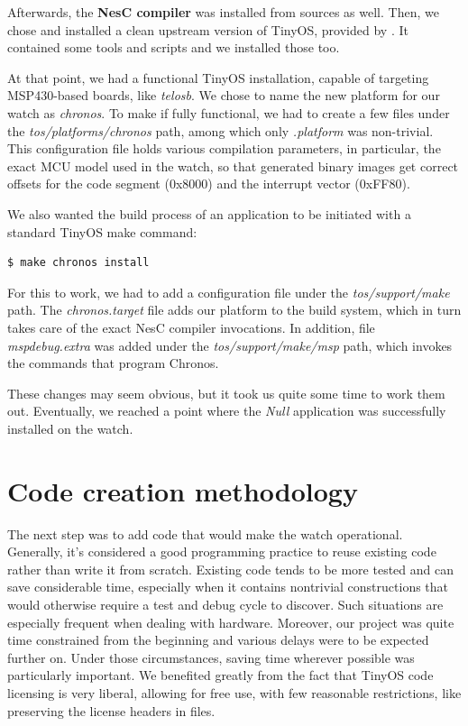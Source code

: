 Afterwards, the {\bf NesC compiler} was installed from sources as well. Then, we chose and installed a clean upstream version of TinyOS, provided by \cite{TOSnet}. It contained some tools and scripts and we installed those too.

At that point, we had a functional TinyOS installation, capable of targeting MSP430-based boards, like \emph{telosb}. We chose to name the new platform for our watch as \emph{chronos}. To make if fully functional, we had to create a few files under the \emph{tos/platforms/chronos} path, among which only \emph{.platform} was non-trivial. This configuration file holds various compilation parameters, in particular, the exact MCU model used in the watch, so that generated binary images get correct offsets for the code segment (0x8000) and the interrupt vector (0xFF80).

We also wanted the build process of an application to be initiated with a standard TinyOS make command:
\begin{lstlisting}[numbers=none, language=bash]
  $ make chronos install
\end{lstlisting}
For this to work, we had to add a configuration file under the \emph{tos/support/make} path. The \emph{chronos.target} file adds our platform to the build system, which in turn takes care of the exact NesC compiler invocations. In addition, file \emph{mspdebug.extra} was added under the \emph{tos/support/make/msp} path, which invokes the commands that program Chronos.

These changes may seem obvious, but it took us quite some time to work them out. Eventually, we reached a point where the \emph{Null} application was successfully installed on the watch.

\section{Code creation methodology}

The next step was to add code that would make the watch operational. Generally, it's considered a good programming practice to reuse existing code rather than write it from scratch. Existing code tends to be more tested and can save considerable time, especially when it contains nontrivial constructions that would otherwise require a test and debug cycle to discover. Such situations are especially frequent when dealing with hardware. Moreover, our project was quite time constrained from the beginning and various delays were to be expected further on. Under those circumstances, saving time wherever possible was particularly important. We benefited greatly from the fact that TinyOS code licensing is very liberal, allowing for free use, with few reasonable restrictions, like preserving the license headers in files.

